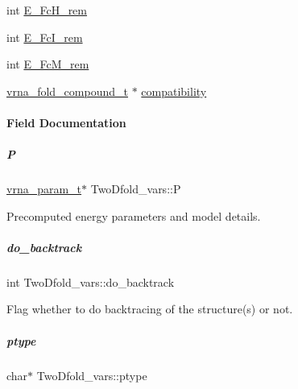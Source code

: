 \begin{DoxyCompactItemize}
\item 
int \mbox{\hyperlink{group__kl__neighborhood__mfe_aa0e78a2b1e48a2545abb5e008f4d92c9}{E\+\_\+\+Fc\+H\+\_\+rem}}
\item 
int \mbox{\hyperlink{group__kl__neighborhood__mfe_ace876be5e864db1f26967dc8f05a2b89}{E\+\_\+\+Fc\+I\+\_\+rem}}
\item 
int \mbox{\hyperlink{group__kl__neighborhood__mfe_a2ea4f8e3d9f3047c4983ed0e299a4f8d}{E\+\_\+\+Fc\+M\+\_\+rem}}
\item 
\mbox{\hyperlink{group__fold__compound_ga1b0cef17fd40466cef5968eaeeff6166}{vrna\+\_\+fold\+\_\+compound\+\_\+t}} $\ast$ \mbox{\hyperlink{group__kl__neighborhood__mfe_a2f12b3838cfdb8d3c769d36cb517459d}{compatibility}}
\end{DoxyCompactItemize}


\paragraph{Field Documentation}
\mbox{\label{group__kl__neighborhood__mfe_a70da9e83ad87c37013b4bf0b265dd307}} 
\subparagraph{\texorpdfstring{P}{P}}
{\footnotesize\ttfamily \mbox{\hyperlink{group__energy__parameters_ga8a69ca7d787e4fd6079914f5343a1f35}{vrna\+\_\+param\+\_\+t}}$\ast$ Two\+Dfold\+\_\+vars\+::P}



Precomputed energy parameters and model details. 

\mbox{\label{group__kl__neighborhood__mfe_ade5c7e9337a458ae20bac75abdc52d64}} 
\subparagraph{\texorpdfstring{do\+\_\+backtrack}{do\_backtrack}}
{\footnotesize\ttfamily int Two\+Dfold\+\_\+vars\+::do\+\_\+backtrack}



Flag whether to do backtracing of the structure(s) or not. 

\mbox{\label{group__kl__neighborhood__mfe_aedf60b8b26dae05ad266d3e098d18208}} 
\subparagraph{\texorpdfstring{ptype}{ptype}}
{\footnotesize\ttfamily char$\ast$ Two\+Dfold\+\_\+vars\+::ptype}



